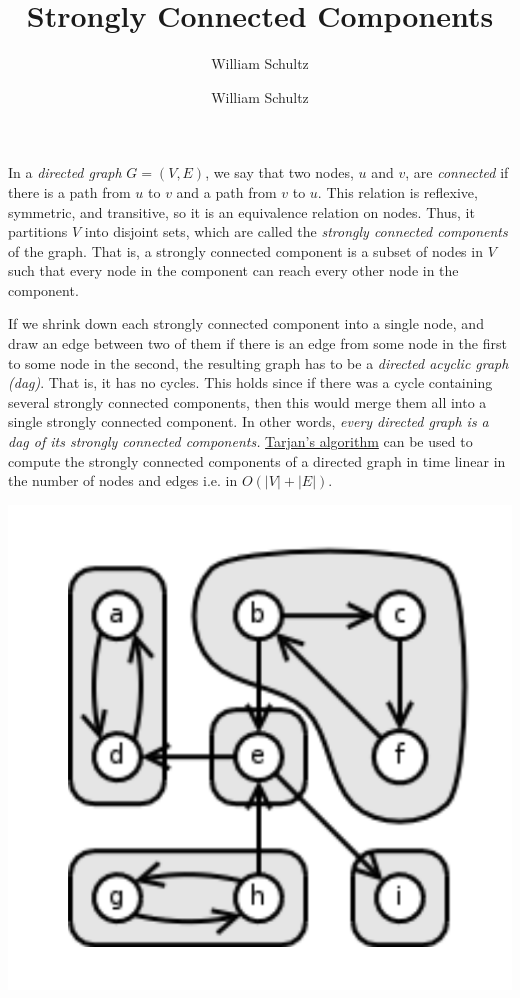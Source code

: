 \documentclass[10pt,a4paper]{article}
\author{William Schultz}
\begin{document}
\title{Strongly Connected Components}
\author{William Schultz}
\maketitle

In a \textit{directed graph} $G=(V,E)$, we say that two nodes, $u$ and $v$, are \textit{connected} if there is a path from $u$ to $v$ and a path from $v$ to $u$. This relation is reflexive, symmetric, and transitive, so it is an equivalence relation on nodes. Thus, it partitions $V$ into disjoint sets, which are called the \textit{strongly connected components} of the graph. That is, a strongly connected component is a subset of nodes in $V$ such that every node in the component can reach every other node in the component.

If we shrink down each strongly connected component into a single node, and draw an edge between two of them if there is an edge from some node in the first to some node in the second, the resulting graph has to be a \textit{directed acyclic graph (dag)}. That is, it has no cycles. This holds since if there was a cycle containing several strongly connected components, then this would merge them all into a single strongly connected component. In other words, \textit{every directed graph is a dag of its strongly connected components.} \href{https://en.wikipedia.org/wiki/Tarjan%27s_strongly_connected_components_algorithm}{Tarjan's algorithm} can be used to compute the strongly connected components of a directed graph in time linear in the number of nodes and edges i.e. in $O(|V| + |E|)$.

\begin{center}
    \includegraphics[scale=0.3]{sccs.png}
\end{center}

% 
% 
\end{document}
